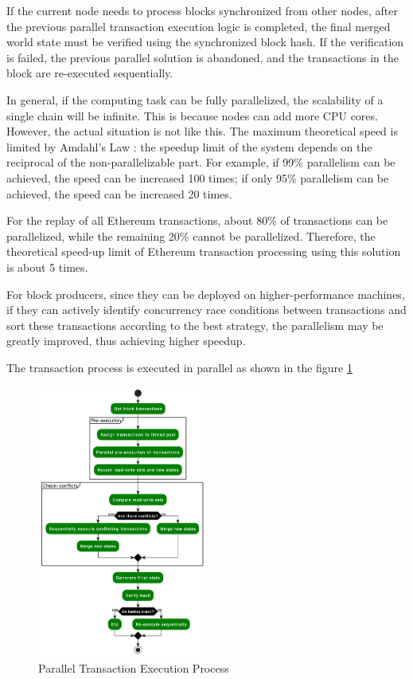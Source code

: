 If the current node needs to process blocks synchronized from other nodes, after the previous parallel transaction execution logic is completed, the final merged world state must be verified using the synchronized block hash. If the verification is failed, the previous parallel solution is abandoned, and the transactions in the block are re-executed sequentially.

In general, if the computing task can be fully parallelized, the scalability of a single chain will be infinite. This is because nodes can add more CPU cores. However, the actual situation is not like this. The maximum theoretical speed is limited by Amdahl's Law \cite{website:Amdahls-law}: the speedup limit of the system depends on the reciprocal of the non-parallelizable part. For example, if 99\% parallelism can be achieved, the speed can be increased 100 times; if only 95\% parallelism can be achieved, the speed can be increased 20 times.

For the replay of all Ethereum transactions, about 80\% of transactions can be parallelized, while the remaining 20\% cannot be parallelized. Therefore, the theoretical speed-up limit of Ethereum transaction processing using this solution is about 5 times.

For block producers, since they can be deployed on higher-performance machines, if they can actively identify concurrency race conditions between transactions and sort these transactions according to the best strategy, the parallelism may be greatly improved, thus achieving higher speedup.

The transaction process is executed in parallel as shown in the figure \ref{fig:paralle-execution}

\begin{figure}[!ht]
    \centering
    \includegraphics[width=0.5\textwidth]{images/paralle-execution.jpg}
    \caption{Parallel Transaction Execution Process}
    \label{fig:paralle-execution}
\end{figure}

